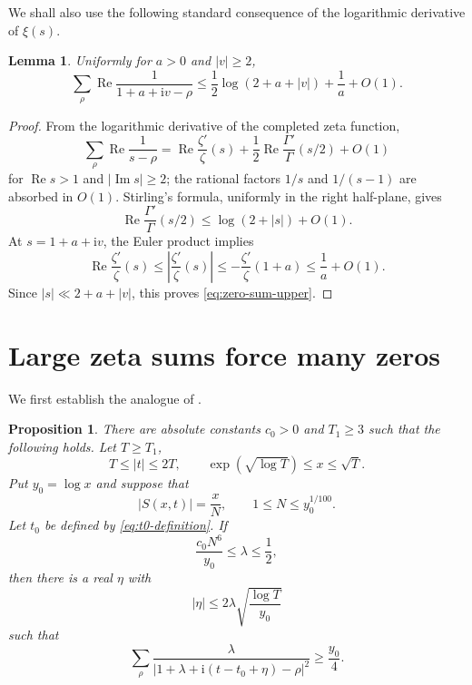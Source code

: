 \documentclass[12pt,reqno]{amsart}
\newtheorem{proposition}[theorem]{Proposition}
\newtheorem{lemma}[theorem]{Lemma}
\theoremstyle{remark}
\numberwithin{equation}{section}
\newcommand{\Ree}{\operatorname{Re}}
\newcommand{\Imm}{\operatorname{Im}}
\newcommand{\ii}{\mathrm i}
\begin{document}
We shall also use the following standard consequence of the logarithmic derivative of $\xi(s)$.

\begin{lemma}\label{lem:zero-sum-upper}
Uniformly for $a>0$ and $|v|\ge2$,
\begin{equation}\label{eq:zero-sum-upper}
\sum_\rho\Ree\frac1{1+a+\ii v-\rho}
\le \frac12\log(2+a+|v|)+\frac1a+O(1).
\end{equation}
\end{lemma}

\begin{proof}
From the logarithmic derivative of the completed zeta function,
\[
\sum_\rho\Ree\frac1{s-\rho}
=
\Ree\frac{\zeta'}{\zeta}(s)
+\frac12\Ree\frac{\Gamma'}{\Gamma}(s/2)
+O(1)
\]
for $\Ree s>1$ and $|\Imm s|\ge2$; the rational factors $1/s$ and $1/(s-1)$ are absorbed in $O(1)$.  Stirling's formula, uniformly in the right half-plane, gives
\[
\Ree\frac{\Gamma'}{\Gamma}(s/2)
\le \log(2+|s|)+O(1).
\]
At $s=1+a+\ii v$, the Euler product implies
\[
\Ree\frac{\zeta'}{\zeta}(s)
\le\left|\frac{\zeta'}{\zeta}(s)\right|
\le-\frac{\zeta'}{\zeta}(1+a)
\le\frac1a+O(1).
\]
Since $|s|\ll 2+a+|v|$, this proves \eqref{eq:zero-sum-upper}.
\end{proof}

\section{Large zeta sums force many zeros}\label{sec:main-proof}

We first establish the analogue of \cite[Proposition 3.4]{GS18}.

\begin{proposition}\label{prop:forcing}
There are absolute constants $c_0>0$ and $T_1\ge3$ such that the following holds.  Let $T\ge T_1$,
\[
T\le |t|\le2T,
\qquad
\exp(\sqrt{\log T})\le x\le\sqrt T.
\]
Put $y_0=\log x$ and suppose that
\[
|S(x,t)|=\frac{x}{N},
\qquad
1\le N\le y_0^{1/100}.
\]
Let $t_0$ be defined by \eqref{eq:t0-definition}.  If
\begin{equation}\label{eq:lambda-range}
\frac{c_0N^6}{y_0}\le\lambda\le\frac12,
\end{equation}
then there is a real $\eta$ with
\begin{equation}\label{eq:eta-range}
|\eta|\le2\lambda\sqrt{\frac{\log T}{y_0}}
\end{equation}
such that
\begin{equation}\label{eq:forcing}
\sum_\rho
\frac{\lambda}{|1+\lambda+\ii(t-t_0+\eta)-\rho|^2}
\ge\frac{y_0}{4}.
\end{equation}
\end{proposition}
\end{document}

